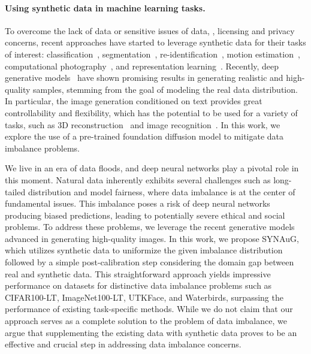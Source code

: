 \paragraph{Using synthetic data in machine learning tasks.}
To overcome the lack of data or sensitive issues of data, \eg, licensing and privacy concerns, recent approaches have started to leverage synthetic data for their tasks of interest:
classification~\cite{antoniou2017data, tran2017bayesian}, segmentation~\cite{sandfort2019data, zhang2021datasetgan}, re-identification~\cite{zheng2017unlabeled}, motion estimation~\cite{dosovitskiy2015flownet, mayer2016large, sun2021autoflow, han2022realflow, oh2018learning}, computational photography~\cite{pan2021dual}, and representation learning~\cite{jahanian2021generative}.
Recently, deep generative models~\cite{rombach2022high, saharia2022photorealistic, nichol2021glide} have shown promising results in generating realistic and high-quality samples, stemming from the goal of modeling the real data distribution.
In particular, the image generation conditioned on text provides great controllability and flexibility, which has the potential to be used for a variety of tasks, such as 3D reconstruction~\cite{poole2023dreamfusion, raj2023dreambooth3d, chen2023fantasia3d} and image recognition~\cite{trabucco2023effective, he2022synthetic, azizi2023synthetic}.
In this work, we explore the use of a pre-trained foundation diffusion model to mitigate data imbalance problems.





We live in an era of data floods, and deep neural networks play a pivotal role in this moment.
Natural data inherently exhibits several challenges such as long-tailed distribution and model fairness, where data imbalance is at the center of fundamental issues.
This imbalance poses a risk of deep neural networks producing biased predictions, leading to potentially severe ethical and social problems.
To address these problems, we leverage the recent generative models advanced in generating high-quality images.
In this work, we propose SYNAuG, which utilizes synthetic data to uniformize the given imbalance distribution followed by a simple post-calibration step considering the domain gap between real and synthetic data.
This straightforward approach yields impressive performance on datasets for distinctive data imbalance problems such as CIFAR100-LT, ImageNet100-LT, UTKFace, and Waterbirds, surpassing the performance of existing task-specific methods.
While we do not claim that our approach serves as a complete solution to the problem of data imbalance, we argue that supplementing the existing data with synthetic data proves to be an effective and crucial step in addressing data imbalance concerns.


